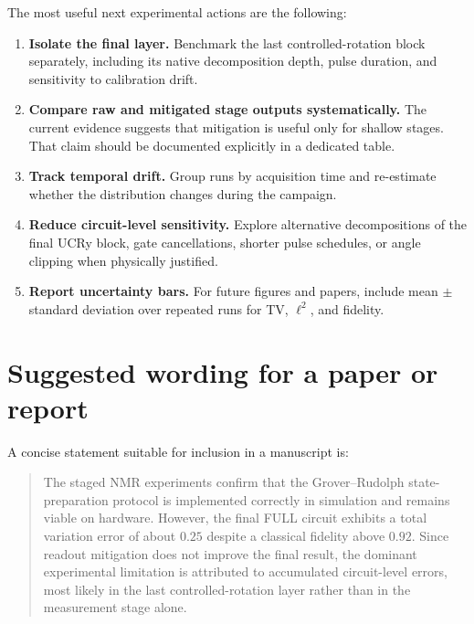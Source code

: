\documentclass[11pt]{article}
\begin{document}
The most useful next experimental actions are the following:
\begin{enumerate}[label=\arabic*.]
\item \textbf{Isolate the final layer.} Benchmark the last controlled-rotation block separately, including its native decomposition depth, pulse duration, and sensitivity to calibration drift.
\item \textbf{Compare raw and mitigated stage outputs systematically.} The current evidence suggests that mitigation is useful only for shallow stages. That claim should be documented explicitly in a dedicated table.
\item \textbf{Track temporal drift.} Group runs by acquisition time and re-estimate whether the distribution changes during the campaign.
\item \textbf{Reduce circuit-level sensitivity.} Explore alternative decompositions of the final UCRy block, gate cancellations, shorter pulse schedules, or angle clipping when physically justified.
\item \textbf{Report uncertainty bars.} For future figures and papers, include mean $\pm$ standard deviation over repeated runs for TV, $\ell^2$, and fidelity.
\end{enumerate}

\section*{Suggested wording for a paper or report}

A concise statement suitable for inclusion in a manuscript is:

\begin{quote}
The staged NMR experiments confirm that the Grover--Rudolph state-preparation protocol is implemented correctly in simulation and remains viable on hardware. However, the final FULL circuit exhibits a total variation error of about $0.25$ despite a classical fidelity above $0.92$. Since readout mitigation does not improve the final result, the dominant experimental limitation is attributed to accumulated circuit-level errors, most likely in the last controlled-rotation layer rather than in the measurement stage alone.
\end{quote}
\end{document}
